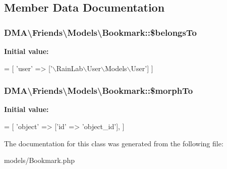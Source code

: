 \subsection{Member Data Documentation}
\hypertarget{classDMA_1_1Friends_1_1Models_1_1Bookmark_a0ea2d8ae2044eb34baeff4502d6feef6}{}
\subsubsection[{\$belongs\+To}]{\setlength{\rightskip}{0pt plus 5cm}D\+M\+A\textbackslash{}\+Friends\textbackslash{}\+Models\textbackslash{}\+Bookmark\+::\$belongs\+To}\label{classDMA_1_1Friends_1_1Models_1_1Bookmark_a0ea2d8ae2044eb34baeff4502d6feef6}
{\bfseries Initial value\+:}
\begin{DoxyCode}
= [
        \textcolor{stringliteral}{'user'} => [\textcolor{stringliteral}{'\(\backslash\)RainLab\(\backslash\)User\(\backslash\)Models\(\backslash\)User'}]
    ]
\end{DoxyCode}
\hypertarget{classDMA_1_1Friends_1_1Models_1_1Bookmark_ad516a6ea7fc7967a8cba2a86340963df}{}
\subsubsection[{\$morph\+To}]{\setlength{\rightskip}{0pt plus 5cm}D\+M\+A\textbackslash{}\+Friends\textbackslash{}\+Models\textbackslash{}\+Bookmark\+::\$morph\+To}\label{classDMA_1_1Friends_1_1Models_1_1Bookmark_ad516a6ea7fc7967a8cba2a86340963df}
{\bfseries Initial value\+:}
\begin{DoxyCode}
= [
        \textcolor{stringliteral}{'object'} => [\textcolor{stringliteral}{'id'} => \textcolor{stringliteral}{'object\_id'}],
    ]
\end{DoxyCode}


The documentation for this class was generated from the following file\+:\begin{DoxyCompactItemize}
\item 
models/Bookmark.\+php\end{DoxyCompactItemize}
